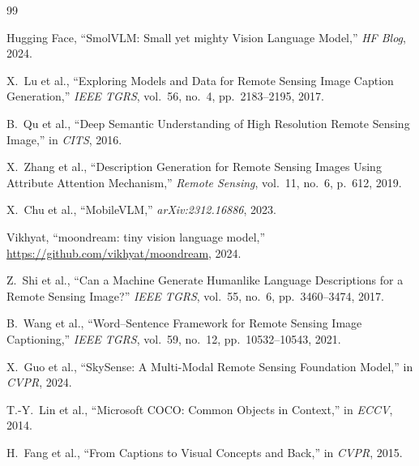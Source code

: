 \documentclass[conference]{IEEEtran}
\begin{document}
\begin{thebibliography}{99}

  Hugging Face, ``SmolVLM: Small yet mighty Vision Language Model,'' \textit{HF Blog}, 2024.

  X.~Lu et al., ``Exploring Models and Data for Remote Sensing Image Caption Generation,''
  \textit{IEEE TGRS}, vol.~56, no.~4, pp.~2183--2195, 2017.

  B.~Qu et al., ``Deep Semantic Understanding of High Resolution Remote Sensing Image,''
  in \textit{CITS}, 2016.

  X.~Zhang et al., ``Description Generation for Remote Sensing Images Using Attribute Attention
  Mechanism,'' \textit{Remote Sensing}, vol.~11, no.~6, p.~612, 2019.

  X.~Chu et al., ``MobileVLM,'' \textit{arXiv:2312.16886}, 2023.

  Vikhyat, ``moondream: tiny vision language model,'' \url{https://github.com/vikhyat/moondream}, 2024.

  Z.~Shi et al., ``Can a Machine Generate Humanlike Language Descriptions for a Remote Sensing
  Image?'' \textit{IEEE TGRS}, vol.~55, no.~6, pp.~3460--3474, 2017.

  B.~Wang et al., ``Word--Sentence Framework for Remote Sensing Image Captioning,''
  \textit{IEEE TGRS}, vol.~59, no.~12, pp.~10532--10543, 2021.

  X.~Guo et al., ``SkySense: A Multi-Modal Remote Sensing Foundation Model,'' in
  \textit{CVPR}, 2024.

  T.-Y.~Lin et al., ``Microsoft COCO: Common Objects in Context,'' in \textit{ECCV}, 2014.

  H.~Fang et al., ``From Captions to Visual Concepts and Back,'' in \textit{CVPR}, 2015.

\end{thebibliography}
\end{document}
